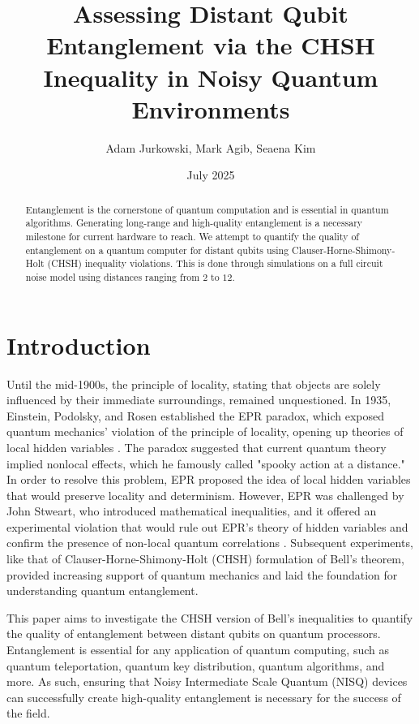 \documentclass[a4paper, onecolumn, 11pt, titlepage]{quantumarticle}
\title{Assessing Distant Qubit Entanglement via the CHSH Inequality in Noisy Quantum Environments}
\author{Adam Jurkowski, Mark Agib, Seaena Kim}
\date{July 2025}
\begin{document}
\maketitle

\begin{abstract}
    Entanglement is the cornerstone of quantum computation and is essential in quantum algorithms. Generating long-range and high-quality entanglement is a necessary milestone for current hardware to reach. We attempt to quantify the quality of entanglement on a quantum computer for distant qubits using Clauser-Horne-Shimony-Holt (CHSH) inequality violations. This is done through simulations on a full circuit noise model using distances ranging from $2$ to $12$.
\end{abstract}



\section{Introduction}
Until the mid-1900s, the principle of locality, stating that objects are solely influenced by their immediate surroundings, remained unquestioned. In 1935, Einstein, Podolsky, and Rosen established the EPR paradox, which exposed quantum mechanics’ violation of the principle of locality, opening up theories of local hidden variables \cite{PhysRev.47.777}. The paradox suggested that current quantum theory implied nonlocal effects, which he famously called "spooky action at a distance." In order to resolve this problem, EPR proposed the idea of local hidden variables that would preserve locality and determinism. However, EPR was challenged by John Stweart, who introduced mathematical inequalities, and it offered an experimental violation that would rule out EPR's theory of hidden variables and confirm the presence of non-local quantum correlations \cite{PhysicsPhysiqueFizika.1.195}. Subsequent experiments, like that of Clauser-Horne-Shimony-Holt (CHSH) formulation of Bell's theorem, provided increasing support of quantum mechanics and laid the foundation for understanding quantum entanglement. 

This paper aims to investigate the CHSH version of Bell's inequalities to quantify the quality of entanglement between distant qubits on quantum processors. Entanglement is essential for any application of quantum computing, such as quantum teleportation, quantum key distribution, quantum algorithms, and more. As such, ensuring that Noisy Intermediate Scale Quantum (NISQ) devices can successfully create high-quality entanglement is necessary for the success of the field. 
\end{document}
